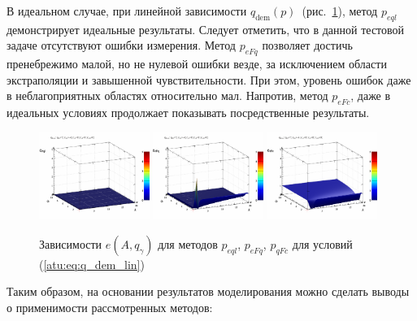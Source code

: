 В идеальном случае, при линейной зависимости $q_\mathrm{dem}(p)$~(рис.~\ref{atu:f:qsl_pe_A_qg_lin}),
метод $p_{eql}$ демонстрирует идеальные результаты.
Следует отметить, что в данной тестовой задаче отсутствуют
ошибки измерения.
Метод $p_{eFq}$ позволяет достичь пренебрежимо малой, но не нулевой
ошибки везде, за исключением области экстраполяции и завышенной чувствительности.
При этом, уровень ошибок даже в неблагоприятных областях
относительно мал. Напротив, метод $p_{eFc}$,
даже в идеальных условиях продолжает показывать
посредственные результаты.

\begin{figure}[htb!]
  \centerline{
    \includegraphics[width=0.32\textwidth]{p/qls_pe-p_A_qg_eql_lin.png}
    \hfill
    \includegraphics[width=0.32\textwidth]{p/qls_pe-p_A_qg_eFq_lin.png}
    \hfill
    \includegraphics[width=0.32\textwidth]{p/qls_pe-p_A_qg_eFc_lin.png}
  }
  \caption{Зависимости $e(A,q_\gamma)$ для методов $p_{eql}$, $p_{eFq}$, $p_{qFc}$ для условий (\ref{atu:eq:q_dem_lin})}
  \label{atu:f:qsl_pe_A_qg_lin}
\end{figure}

Таким образом, на основании результатов моделирования
можно сделать выводы о применимости рассмотренных методов:

